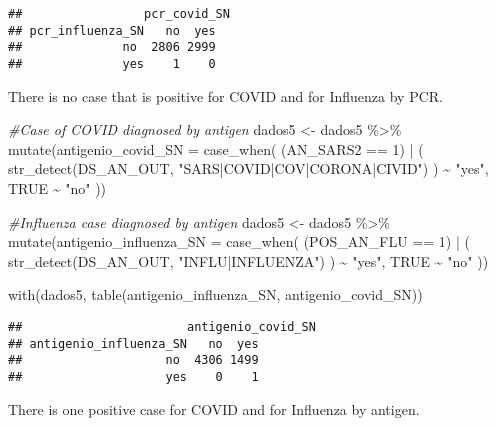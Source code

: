\documentclass[
]{article}
\newenvironment{Shaded}{\begin{snugshade}}{\end{snugshade}}
\newcommand{\AttributeTok}[1]{\textcolor[rgb]{0.77,0.63,0.00}{#1}}
\newcommand{\CommentTok}[1]{\textcolor[rgb]{0.56,0.35,0.01}{\textit{#1}}}
\newcommand{\ConstantTok}[1]{\textcolor[rgb]{0.00,0.00,0.00}{#1}}
\newcommand{\DecValTok}[1]{\textcolor[rgb]{0.00,0.00,0.81}{#1}}
\newcommand{\FunctionTok}[1]{\textcolor[rgb]{0.00,0.00,0.00}{#1}}
\newcommand{\NormalTok}[1]{#1}
\newcommand{\OtherTok}[1]{\textcolor[rgb]{0.56,0.35,0.01}{#1}}
\newcommand{\SpecialCharTok}[1]{\textcolor[rgb]{0.00,0.00,0.00}{#1}}
\newcommand{\StringTok}[1]{\textcolor[rgb]{0.31,0.60,0.02}{#1}}
\begin{document}
\begin{verbatim}
##                 pcr_covid_SN
## pcr_influenza_SN   no  yes
##              no  2806 2999
##              yes    1    0
\end{verbatim}

There is no case that is positive for COVID and for Influenza by PCR.

\begin{Shaded}
\begin{Highlighting}[]
\CommentTok{\#Case of COVID diagnosed by antigen}
\NormalTok{dados5 }\OtherTok{\textless{}{-}}\NormalTok{ dados5 }\SpecialCharTok{\%\textgreater{}\%}
  \FunctionTok{mutate}\NormalTok{(}\AttributeTok{antigenio\_covid\_SN =} \FunctionTok{case\_when}\NormalTok{(}
\NormalTok{    (AN\_SARS2 }\SpecialCharTok{==} \DecValTok{1}\NormalTok{) }\SpecialCharTok{|}
\NormalTok{      (}
        \FunctionTok{str\_detect}\NormalTok{(DS\_AN\_OUT, }\StringTok{"SARS|COVID|COV|CORONA|CIVID"}\NormalTok{) }
\NormalTok{      ) }\SpecialCharTok{\textasciitilde{}} \StringTok{"yes"}\NormalTok{,  }
    \ConstantTok{TRUE} \SpecialCharTok{\textasciitilde{}} \StringTok{"no"} 
\NormalTok{  ))}


\CommentTok{\#Influenza case diagnosed by antigen}
\NormalTok{dados5 }\OtherTok{\textless{}{-}}\NormalTok{ dados5 }\SpecialCharTok{\%\textgreater{}\%}
  \FunctionTok{mutate}\NormalTok{(}\AttributeTok{antigenio\_influenza\_SN =} \FunctionTok{case\_when}\NormalTok{(}
\NormalTok{    (POS\_AN\_FLU }\SpecialCharTok{==} \DecValTok{1}\NormalTok{) }\SpecialCharTok{|}
\NormalTok{      (}
        \FunctionTok{str\_detect}\NormalTok{(DS\_AN\_OUT, }\StringTok{"INFLU|INFLUENZA"}\NormalTok{) }
\NormalTok{      ) }\SpecialCharTok{\textasciitilde{}} \StringTok{"yes"}\NormalTok{,  }
    \ConstantTok{TRUE} \SpecialCharTok{\textasciitilde{}} \StringTok{"no"}  
\NormalTok{  ))}

\FunctionTok{with}\NormalTok{(dados5, }\FunctionTok{table}\NormalTok{(antigenio\_influenza\_SN, antigenio\_covid\_SN))}
\end{Highlighting}
\end{Shaded}

\begin{verbatim}
##                       antigenio_covid_SN
## antigenio_influenza_SN   no  yes
##                    no  4306 1499
##                    yes    0    1
\end{verbatim}

There is one positive case for COVID and for Influenza by antigen.
\end{document}
